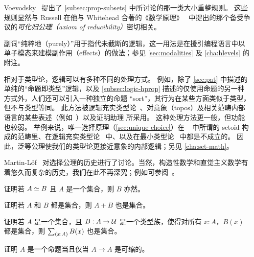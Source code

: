 %
Voevodsky~\cite{Universe-poly} 提出了 \cref{subsec:prop-subsets} 中所讨论的那一类大小重整规则。
%
这些规则显然与 Russell 在他与 Whitehead 合著的《数学原理》~\cite{PM2} 中提出的那个备受争议的\emph{可化归公理（axiom of reducibility）}密切相关。

副词“纯粹地（purely）”用于指代未截断的逻辑，这一用法是在援引编程语言中以单子模态来建模副作用（effects）的做法；参见 \cref{sec:modalities} 及 \cref{cha:hlevels} 的附注。

相对于类型论，逻辑可以有多种不同的处理方式。
例如，除了 \cref{sec:pat} 中描述的单纯的“命题即类型”逻辑，以及 \cref{subsec:logic-hprop} 描述的仅使用命题的另一种方式外，人们还可以引入一种独立的命题 ``sort''，其行为在某些方面类似于类型，但不与类型等同。
此方法被逻辑充实类型论~\cite{aczel2002collection}、对意象（topos）及相关范畴内部语言的某些表述（例如~\cite{jacobs1999categorical,elephant}）以及证明助理 \Coq{} 所采用。
这种处理方法更一般，但功能也较弱。
举例来说，唯一选择原理（\cref{sec:unique-choice}）在 \Coq~\cite{Spiwack} 中所谓的 setoid 构成的范畴里、在逻辑充实类型论~\cite{aczel2002collection} 中、以及在最小类型论~\cite{maietti2005toward} 中都是不成立的。
因此，泛等公理使我们的类型论更接近意象的内部逻辑；另见 \cref{cha:set-math}。

Martin-L\"of~\cite{martin2006100} 对选择公理的历史进行了讨论。当然，构造性数学和直觉主义数学有着悠久而复杂的历史，我们在此不再深究；例如可参阅~\cite{TroelstraI,TroelstraII}。

\sectionExercises

\begin{ex}\label{ex:equiv-functor-set}
  证明若 $A \simeq B$ 且 $A$ 是一个集合，则 $B$ 亦然。
\end{ex}

\begin{ex}\label{ex:isset-coprod}
  证明若 $A$ 和 $B$ 都是集合，则 $A+B$ 也是集合。
\end{ex}

\begin{ex}\label{ex:isset-sigma}
  证明若 $A$ 是一个集合，且 $B:A\to \mathcal{U}$ 是一个类型族，使得对所有 $x:A$，$B(x)$ 都是集合，则 $\sm{x:A} B(x)$ 也是集合。
\end{ex}

\begin{ex}\label{ex:prop-endocontr}
  证明 $A$ 是一个命题当且仅当 $A\to A$ 是可缩的。
\end{ex}

